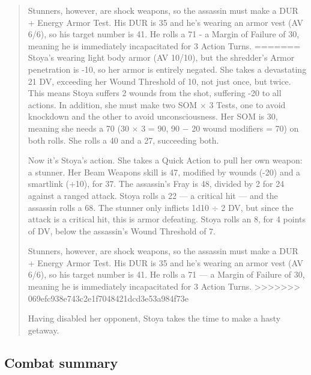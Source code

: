 \begin{quotation}
Stunners, however, are shock weapons, so the assassin must make a DUR + Energy Armor Test. His DUR is 35 and he’s wearing an armor vest (AV 6/6), so his target number is 41. He rolls a 71 - a Margin of Failure of 30, meaning he is immediately incapacitated for 3 Action Turns. ======= Stoya’s wearing light body armor (AV 10/10), but the shredder’s Armor penetration is -10, so her armor is entirely negated. She takes a devastating 21 DV, exceeding her Wound Threshold of 10, not just once, but twice. This means Stoya suffers 2 wounds from the shot, suffering -20 to all actions. In addition, she must make two SOM $\times$ 3 Tests, one to avoid knockdown and the other to avoid unconsciousness. Her SOM is 30, meaning she needs a 70 (30 $\times$ 3 = 90, 90 $-$ 20 wound modifiers = 70) on both rolls. She rolls a 40 and a 27, succeeding both. 

Now it’s Stoya’s action. She takes a Quick Action to pull her own weapon: a stunner. Her Beam Weapons skill is 47, modified by wounds (-20) and a smartlink (+10), for 37. The assassin’s Fray is 48, divided by 2 for 24 against a ranged attack. Stoya rolls a 22 --- a critical hit --- and the assassin rolls a 68. The stunner only inflicts 1d10 $\div$ 2 DV, but since the attack is a critical hit, this is armor defeating. Stoya rolls an 8, for 4 points of DV, below the assassin’s Wound Threshold of 7. 

Stunners, however, are shock weapons, so the assassin must make a DUR + Energy Armor Test. His DUR is 35 and he’s wearing an armor vest (AV 6/6), so his target number is 41. He rolls a 71 --- a Margin of Failure of 30, meaning he is immediately incapacitated for 3 Action Turns. >>>>>>> 069efc938e743c2e1f7048421dcd3e53a984f73e 

Having disabled her opponent, Stoya takes the time to make a hasty getaway. \end{quotation} 



\subsection{Combat summary} 

